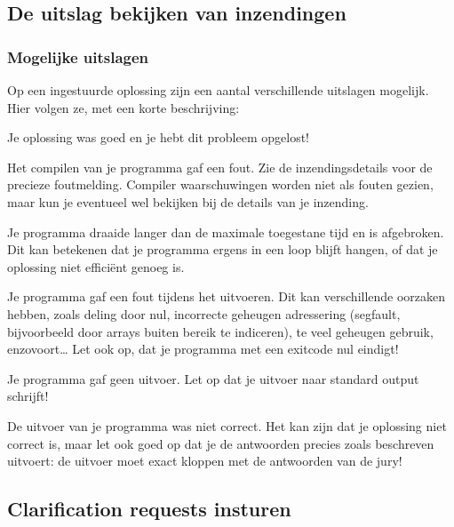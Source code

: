 \documentclass[11pt,titlepage,a4paper]{article}
\begin{document}
\subsection{De uitslag bekijken van inzendingen}

\subsubsection{Mogelijke uitslagen}

Op een ingestuurde oplossing zijn een aantal verschillende uitslagen
mogelijk. Hier volgen ze, met een korte beschrijving:

\begin{description}[\setleftmargin{4.5cm}]
\item[CORRECT]
Je oplossing was goed en je hebt dit probleem opgelost!

\item[COMPILER-ERROR]
Het compilen van je programma gaf een fout. Zie de inzendingsdetails
voor de precieze foutmelding. Compiler waarschuwingen worden niet als
fouten gezien, maar kun je eventueel wel bekijken bij de details van
je inzending.

\item[TIMELIMIT]
Je programma draaide langer dan de maximale toegestane tijd en is
afgebroken. Dit kan betekenen dat je programma ergens in een loop
blijft hangen, of dat je oplossing niet effici\"ent genoeg is.

\item[RUN-ERROR]
Je programma gaf een fout tijdens het uitvoeren. Dit kan verschillende
oorzaken hebben, zoals deling door nul, incorrecte geheugen adressering
(segfault, bijvoorbeeld door arrays buiten bereik te indiceren), te
veel geheugen gebruik, enzovoort\dots
Let ook op, dat je programma met een exitcode nul eindigt!

\item[NO-OUTPUT]
Je programma gaf geen uitvoer. Let op dat je uitvoer naar standard
output schrijft!

\item[WRONG-ANSWER]
De uitvoer van je programma was niet correct. Het kan zijn dat je
oplossing niet correct is, maar let ook goed op dat je de antwoorden
precies zoals beschreven uitvoert: de uitvoer moet exact kloppen met
de antwoorden van de jury!

\end{description}


\subsection{Clarification requests insturen}
\end{document}
